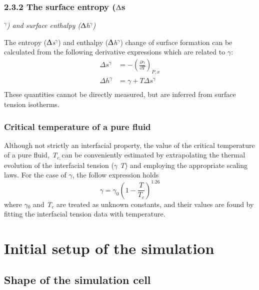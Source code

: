 \documentclass{scrbook}
\begin{document}
\subsection{2.3.2 The surface entropy (${\Updelta}$s}$^{{\gamma}}$\textit{) and surface enthalpy (${\Updelta}$h}$^{{\gamma}}$\textit{)}

The entropy (${\Updelta}$\textit{s}$^{{\gamma}}$) and enthalpy
(${\Updelta}$\textit{h}$^{{\gamma}}$) change of surface formation can be
calculated from the following derivative expressions which are related to
{${\gamma}$}\citep{evans1992}: 
\begin{align}
  \Delta s^{\gamma} &=-\left(\frac{\partial\gamma}{\partial T}\right)_{P,x} \\
  \Delta h^{\gamma} &=\gamma+T\Delta s^{\gamma} \\
\end{align}
These quantities cannot be directly measured, but are inferred from surface tension isotherms.

\subsection{Critical temperature of a pure fluid}

Although not strictly an interfacial property, the value of the critical
temperature of a pure fluid\textit{, T}$_{c, }$can be conveniently estimated by
extrapolating the thermal evolution of the interfacial tension (${\gamma}$
\textendash{} \textit{T}) and employing the appropriate scaling laws. For the
case of ${\gamma}$, the follow expression holds\citep{evans1992}
\begin{equation}
\gamma=\gamma_{0}\left(1-\frac{T}{T_{c}}\right)^{1.26}
\end{equation}
where ${\gamma}$$_{0}$ and \textit{T}$_{c}$ are treated as unknown constants,
and their values are found by fitting the interfacial tension data with
temperature.

\chapter{Initial setup of the simulation}

\section{Shape of the simulation cell}
\end{document}
